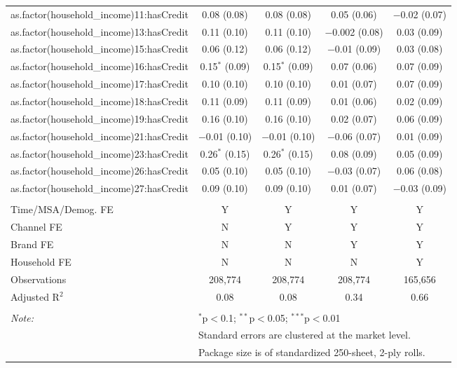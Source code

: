 \begin{table}[!htbp]
\begin{tabular}{@{\extracolsep{5pt}}lcccc}
  as.factor(household\_income)11:hasCredit & 0.08 (0.08) & 0.08 (0.08) & 0.05 (0.06) & $-$0.02 (0.07) \\ 
  as.factor(household\_income)13:hasCredit & 0.11 (0.10) & 0.11 (0.10) & $-$0.002 (0.08) & 0.03 (0.09) \\ 
  as.factor(household\_income)15:hasCredit & 0.06 (0.12) & 0.06 (0.12) & $-$0.01 (0.09) & 0.03 (0.08) \\ 
  as.factor(household\_income)16:hasCredit & 0.15$^{*}$ (0.09) & 0.15$^{*}$ (0.09) & 0.07 (0.06) & 0.07 (0.09) \\ 
  as.factor(household\_income)17:hasCredit & 0.10 (0.10) & 0.10 (0.10) & 0.01 (0.07) & 0.07 (0.09) \\ 
  as.factor(household\_income)18:hasCredit & 0.11 (0.09) & 0.11 (0.09) & 0.01 (0.06) & 0.02 (0.09) \\ 
  as.factor(household\_income)19:hasCredit & 0.16 (0.10) & 0.16 (0.10) & 0.02 (0.07) & 0.06 (0.09) \\ 
  as.factor(household\_income)21:hasCredit & $-$0.01 (0.10) & $-$0.01 (0.10) & $-$0.06 (0.07) & 0.01 (0.09) \\ 
  as.factor(household\_income)23:hasCredit & 0.26$^{*}$ (0.15) & 0.26$^{*}$ (0.15) & 0.08 (0.09) & 0.05 (0.09) \\ 
  as.factor(household\_income)26:hasCredit & 0.05 (0.10) & 0.05 (0.10) & $-$0.03 (0.07) & 0.06 (0.08) \\ 
  as.factor(household\_income)27:hasCredit & 0.09 (0.10) & 0.09 (0.10) & 0.01 (0.07) & $-$0.03 (0.09) \\ 
 \hline \\[-1.8ex] 
Time/MSA/Demog. FE & Y & Y & Y & Y \\ 
Channel FE & N & Y & Y & Y \\ 
Brand FE & N & N & Y & Y \\ 
Household FE & N & N & N & Y \\ 
Observations & 208,774 & 208,774 & 208,774 & 165,656 \\ 
Adjusted R$^{2}$ & 0.08 & 0.08 & 0.34 & 0.66 \\ 
\hline 
\hline \\[-1.8ex] 
\textit{Note:}  & \multicolumn{4}{l}{$^{*}$p$<$0.1; $^{**}$p$<$0.05; $^{***}$p$<$0.01} \\ 
 & \multicolumn{4}{l}{Standard errors are clustered at the market level.} \\ 
 & \multicolumn{4}{l}{Package size is of standardized 250-sheet, 2-ply rolls.} \\ 
\end{tabular} 
\end{table} 
